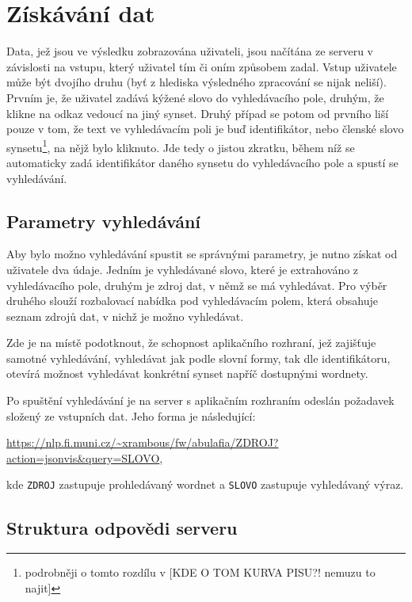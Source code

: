 \documentclass[a4paper, 11pt, oneside]{book}
\begin{document}
			\section{Získávání dat}
				
				Data, jež jsou ve výsledku zobrazována uživateli, jsou načítána ze serveru v závislosti na vstupu, který uživatel tím či oním způsobem zadal. Vstup uživatele může být dvojího druhu (byť z hlediska výsledného zpracování se nijak neliší). Prvním je, že uživatel zadává kýžené slovo do vyhledávacího pole, druhým, že klikne na odkaz vedoucí na jiný synset. Druhý případ se potom od prvního liší pouze v tom, že text ve vyhledávacím poli je buď identifikátor, nebo členské slovo synsetu\footnote{podrobněji o tomto rozdílu v [KDE O TOM KURVA PISU?! nemuzu to najit]}, na nějž bylo kliknuto. Jde tedy o jistou zkratku, během níž se automaticky zadá identifikátor daného synsetu do vyhledávacího pole a spustí se vyhledávání.

				\subsection{Parametry vyhledávání}
				
					Aby bylo možno vyhledávání spustit se správnými parametry, je nutno získat od uživatele dva údaje. Jedním je vyhledávané slovo, které je extrahováno z vyhledávacího pole, druhým je zdroj dat, v němž se má vyhledávat. Pro výběr druhého slouží rozbalovací nabídka pod vyhledávacím polem, která obsahuje seznam zdrojů dat, v nichž je možno vyhledávat.

					Zde je na místě podotknout, že schopnost aplikačního rozhraní, jež zajišťuje samotné vyhledávání, vyhledávat jak podle slovní formy, tak dle identifikátoru, otevírá možnost vyhledávat konkrétní synset napříč dostupnými wordnety. 

					Po spuštění vyhledávání je na server s aplikačním rozhraním odeslán požadavek složený ze vstupních dat. Jeho forma je následující:

					\medskip
					\url{https://nlp.fi.muni.cz/~xrambous/fw/abulafia/ZDROJ?action=jsonvis&query=SLOVO}\hspace{1em},
					\medskip

					kde \texttt{ZDROJ} zastupuje prohledávaný wordnet a \texttt{SLOVO} zastupuje vyhledávaný výraz.

				\subsection{Struktura odpovědi serveru}
				\label{cha:answerStruct}
\end{document}

